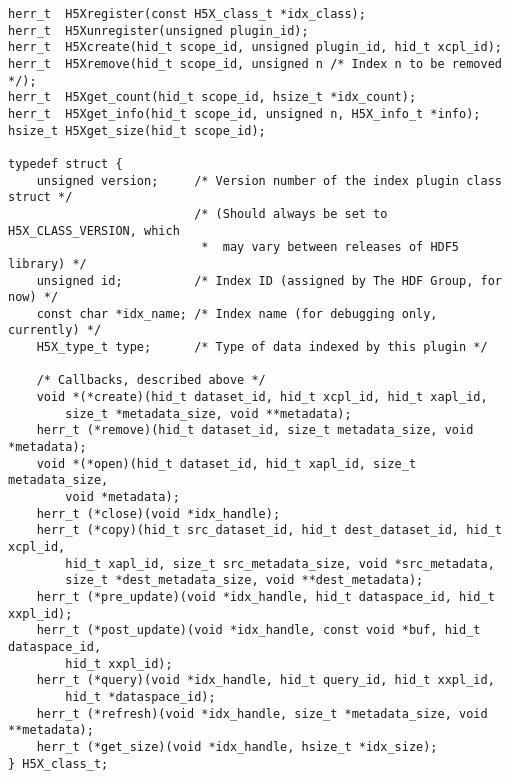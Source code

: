 {
\begin{lstlisting}
herr_t  H5Xregister(const H5X_class_t *idx_class);
herr_t  H5Xunregister(unsigned plugin_id);
herr_t  H5Xcreate(hid_t scope_id, unsigned plugin_id, hid_t xcpl_id);
herr_t  H5Xremove(hid_t scope_id, unsigned n /* Index n to be removed */);
herr_t  H5Xget_count(hid_t scope_id, hsize_t *idx_count);
herr_t  H5Xget_info(hid_t scope_id, unsigned n, H5X_info_t *info);
hsize_t H5Xget_size(hid_t scope_id);

typedef struct {
    unsigned version;     /* Version number of the index plugin class struct */
                          /* (Should always be set to H5X_CLASS_VERSION, which
                           *  may vary between releases of HDF5 library) */
    unsigned id;          /* Index ID (assigned by The HDF Group, for now) */
    const char *idx_name; /* Index name (for debugging only, currently) */
    H5X_type_t type;      /* Type of data indexed by this plugin */

    /* Callbacks, described above */
    void *(*create)(hid_t dataset_id, hid_t xcpl_id, hid_t xapl_id,
        size_t *metadata_size, void **metadata);
    herr_t (*remove)(hid_t dataset_id, size_t metadata_size, void *metadata);
    void *(*open)(hid_t dataset_id, hid_t xapl_id, size_t metadata_size,
        void *metadata);
    herr_t (*close)(void *idx_handle);
    herr_t (*copy)(hid_t src_dataset_id, hid_t dest_dataset_id, hid_t xcpl_id,
        hid_t xapl_id, size_t src_metadata_size, void *src_metadata,
        size_t *dest_metadata_size, void **dest_metadata);
    herr_t (*pre_update)(void *idx_handle, hid_t dataspace_id, hid_t xxpl_id);
    herr_t (*post_update)(void *idx_handle, const void *buf, hid_t dataspace_id,
        hid_t xxpl_id);
    herr_t (*query)(void *idx_handle, hid_t query_id, hid_t xxpl_id,
        hid_t *dataspace_id);
    herr_t (*refresh)(void *idx_handle, size_t *metadata_size, void **metadata);
    herr_t (*get_size)(void *idx_handle, hsize_t *idx_size);
} H5X_class_t;
\end{lstlisting}
}

